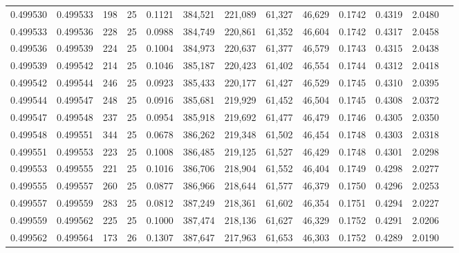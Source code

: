 \begin{tabular}{rrrrrrrrrrrrr}
0.499530 & 0.499533 & 198 &  25 &                                     0.1121 & 384,521 & 221,089 &  61,327 &  46,629 & 0.1742 & 0.4319 & 2.0480 \\
0.499533 & 0.499536 & 228 &  25 &                                     0.0988 & 384,749 & 220,861 &  61,352 &  46,604 & 0.1742 & 0.4317 & 2.0458 \\
0.499536 & 0.499539 & 224 &  25 &                                     0.1004 & 384,973 & 220,637 &  61,377 &  46,579 & 0.1743 & 0.4315 & 2.0438 \\
0.499539 & 0.499542 & 214 &  25 &                                     0.1046 & 385,187 & 220,423 &  61,402 &  46,554 & 0.1744 & 0.4312 & 2.0418 \\
0.499542 & 0.499544 & 246 &  25 &                                     0.0923 & 385,433 & 220,177 &  61,427 &  46,529 & 0.1745 & 0.4310 & 2.0395 \\
0.499544 & 0.499547 & 248 &  25 &                                     0.0916 & 385,681 & 219,929 &  61,452 &  46,504 & 0.1745 & 0.4308 & 2.0372 \\
0.499547 & 0.499548 & 237 &  25 &                                     0.0954 & 385,918 & 219,692 &  61,477 &  46,479 & 0.1746 & 0.4305 & 2.0350 \\
0.499548 & 0.499551 & 344 &  25 &                                     0.0678 & 386,262 & 219,348 &  61,502 &  46,454 & 0.1748 & 0.4303 & 2.0318 \\
0.499551 & 0.499553 & 223 &  25 &                                     0.1008 & 386,485 & 219,125 &  61,527 &  46,429 & 0.1748 & 0.4301 & 2.0298 \\
0.499553 & 0.499555 & 221 &  25 &                                     0.1016 & 386,706 & 218,904 &  61,552 &  46,404 & 0.1749 & 0.4298 & 2.0277 \\
0.499555 & 0.499557 & 260 &  25 &                                     0.0877 & 386,966 & 218,644 &  61,577 &  46,379 & 0.1750 & 0.4296 & 2.0253 \\
0.499557 & 0.499559 & 283 &  25 &                                     0.0812 & 387,249 & 218,361 &  61,602 &  46,354 & 0.1751 & 0.4294 & 2.0227 \\
0.499559 & 0.499562 & 225 &  25 &                                     0.1000 & 387,474 & 218,136 &  61,627 &  46,329 & 0.1752 & 0.4291 & 2.0206 \\
0.499562 & 0.499564 & 173 &  26 &                                     0.1307 & 387,647 & 217,963 &  61,653 &  46,303 & 0.1752 & 0.4289 & 2.0190 \\

\end{tabular}
